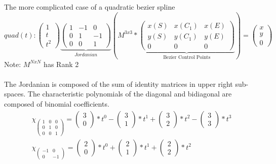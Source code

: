 \documentclass[a4paper,portrait]{report}
\begin{document}
The more complicated case of a quadratic bezier spline
\begin{equation}
quad(t):
\begin{pmatrix}
1 \\
t \\
t^2
\end{pmatrix}
\underbrace{\begin{pmatrix}
1 & -1 & 0\\
0 & 1 & -1\\
0 & 0 &1
\end{pmatrix}}_{Jordanian}
(M^{3x3}*\underbrace{\begin{pmatrix}
x(S) & x(C_{1}) & x(E) \\
y(S) & y(C_{1}) & y(E) \\
0 & 0 & 0
\end{pmatrix}}_{\text{Bezier Control Points}})
=
\begin{pmatrix}
x \\
y \\
0
\end{pmatrix}
\end{equation}
Note: $M^{NxN}$ has Rank 2\\\\
The Jordanian is composed of the sum of identity matrices in upper right sub-spaces.
The characteristic polynomials of the diagonal and bidiagonal are composed of binomial coefficients.
\begin{align}
\chi_{\begin{pmatrix}1 & 0 & 0\\0 & 1 & 0\\0 & 0 & 1\end{pmatrix}} = \begin{pmatrix}3 \\ 0\end{pmatrix}*t^0 - \begin{pmatrix}3 \\ 1\end{pmatrix}*t^1 + \begin{pmatrix}3 \\ 2\end{pmatrix}*t^2 - \begin{pmatrix}3 \\ 3\end{pmatrix}*t^3\\
\chi_{\begin{pmatrix}-1 & 0\\0 & -1\end{pmatrix}} = \begin{pmatrix}2 \\ 0\end{pmatrix}*t^0 + \begin{pmatrix}2 \\ 1\end{pmatrix}*t^1 + \begin{pmatrix}2 \\ 2\end{pmatrix}*t^2
\end{align}
\end{document}
